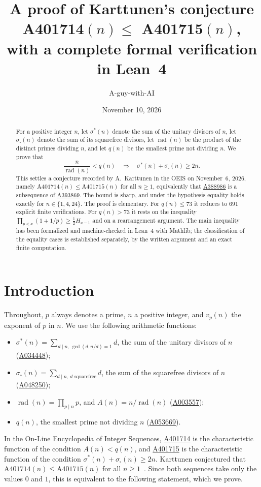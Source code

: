 \documentclass[11pt,a4paper]{amsart}
\title[A proof of the conjecture A401714(n) $\le$ A401715(n)]{A proof of Karttunen's conjecture\\ A401714$(n) \le$ A401715$(n)$, \\ with a complete formal verification in Lean~4}
\author{A-guy-with-AI}
\date{November 10, 2026}
\theoremstyle{definition}
\theoremstyle{remark}
\newcommand{\usig}{\sigma^{*}}
\newcommand{\ssq}{\sigma_{\square}}
\newcommand{\rad}{\operatorname{rad}}
\newcommand{\oeis}[1]{\href{https://oeis.org/#1}{#1}}
\begin{document}
\begin{abstract}
For a positive integer $n$, let $\usig(n)$ denote the sum of the unitary divisors of $n$, let $\ssq(n)$ denote the sum of its squarefree divisors, let $\rad(n)$ be the product of the distinct primes dividing $n$, and let $q(n)$ be the smallest prime not dividing $n$. We prove that
\[
  \frac{n}{\rad(n)} < q(n) \quad\Longrightarrow\quad \usig(n) + \ssq(n) \ge 2n .
\]
This settles a conjecture recorded by A.~Karttunen in the OEIS on November~6, 2026, namely $\mathrm{A401714}(n) \le \mathrm{A401715}(n)$ for all $n \ge 1$, equivalently that \oeis{A388986} is a subsequence of \oeis{A393869}. The bound is sharp, and under the hypothesis equality holds exactly for $n \in \{1,4,24\}$. The proof is elementary. For $q(n) \le 73$ it reduces to $691$ explicit finite verifications. For $q(n) > 73$ it rests on the inequality $\prod_{p<x}(1+1/p) \ge \tfrac12 H_{x-1}$ and on a rearrangement argument. The main inequality has been formalized and machine-checked in Lean~4 with Mathlib; the classification of the equality cases is established separately, by the written argument and an exact finite computation.
\end{abstract}

\maketitle

\section{Introduction}

Throughout, $p$ always denotes a prime, $n$ a positive integer, and $v_p(n)$ the exponent of $p$ in $n$. We use the following arithmetic functions:
\begin{itemize}[leftmargin=2em]
  \item $\usig(n) = \sum_{d \mid n,\ \gcd(d,n/d)=1} d$, the sum of the unitary divisors of $n$ (\oeis{A034448});
  \item $\ssq(n) = \sum_{d \mid n,\ d \text{ squarefree}} d$, the sum of the squarefree divisors of $n$ (\oeis{A048250});
  \item $\rad(n) = \prod_{p \mid n} p$, and $A(n) = n/\rad(n)$ (\oeis{A003557});
  \item $q(n)$, the smallest prime not dividing $n$ (\oeis{A053669}).
\end{itemize}

In the On-Line Encyclopedia of Integer Sequences, \oeis{A401714} is the characteristic function of the condition $A(n) < q(n)$, and \oeis{A401715} is the characteristic function of the condition $\usig(n)+\ssq(n) \ge 2n$. Karttunen conjectured that $\mathrm{A401714}(n) \le \mathrm{A401715}(n)$ for all $n \ge 1$~\cite{A401714,A401715}. Since both sequences take only the values $0$ and $1$, this is equivalent to the following statement, which we prove.
\end{document}
